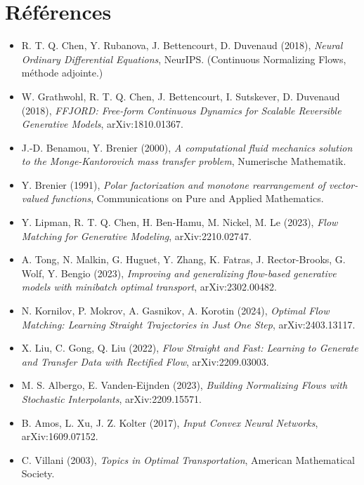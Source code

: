 \documentclass[11pt,a4paper]{article}
\theoremstyle{definition}
\theoremstyle{plain}
\theoremstyle{remark}
\begin{document}
\section*{Références}
\begin{itemize}[leftmargin=*]
  \item R. T. Q. Chen, Y. Rubanova, J. Bettencourt, D. Duvenaud (2018),
  \emph{Neural Ordinary Differential Equations}, NeurIPS. (Continuous
  Normalizing Flows, méthode adjointe.)
  \item W. Grathwohl, R. T. Q. Chen, J. Bettencourt, I. Sutskever, D. Duvenaud
  (2018), \emph{FFJORD: Free-form Continuous Dynamics for Scalable Reversible
  Generative Models}, arXiv:1810.01367.
  \item J.-D. Benamou, Y. Brenier (2000), \emph{A computational fluid mechanics
  solution to the Monge-Kantorovich mass transfer problem}, Numerische
  Mathematik.
  \item Y. Brenier (1991), \emph{Polar factorization and monotone rearrangement
  of vector-valued functions}, Communications on Pure and Applied Mathematics.
  \item Y. Lipman, R. T. Q. Chen, H. Ben-Hamu, M. Nickel, M. Le (2023),
  \emph{Flow Matching for Generative Modeling}, arXiv:2210.02747.
  \item A. Tong, N. Malkin, G. Huguet, Y. Zhang, K. Fatras, J. Rector-Brooks,
  G. Wolf, Y. Bengio (2023), \emph{Improving and generalizing flow-based
  generative models with minibatch optimal transport}, arXiv:2302.00482.
  \item N. Kornilov, P. Mokrov, A. Gasnikov, A. Korotin (2024), \emph{Optimal
  Flow Matching: Learning Straight Trajectories in Just One Step},
  arXiv:2403.13117.
  \item X. Liu, C. Gong, Q. Liu (2022), \emph{Flow Straight and Fast: Learning
  to Generate and Transfer Data with Rectified Flow}, arXiv:2209.03003.
  \item M. S. Albergo, E. Vanden-Eijnden (2023), \emph{Building Normalizing
  Flows with Stochastic Interpolants}, arXiv:2209.15571.
  \item B. Amos, L. Xu, J. Z. Kolter (2017), \emph{Input Convex Neural
  Networks}, arXiv:1609.07152.
  \item C. Villani (2003), \emph{Topics in Optimal Transportation}, American
  Mathematical Society.
\end{itemize}
\end{document}
